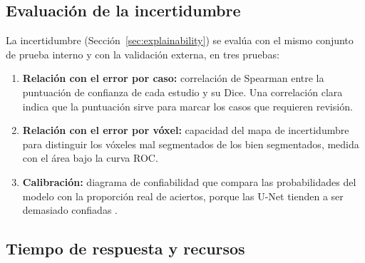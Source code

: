 \subsection{Evaluación de la incertidumbre}\label{sec:uncertainty-eval}
La incertidumbre (Sección~\ref{sec:explainability}) se evalúa con el mismo
conjunto de prueba interno y con la validación externa, en tres pruebas:

\begin{enumerate}
    \item \textbf{Relación con el error por caso:} correlación de Spearman
          entre la puntuación de confianza de cada estudio y su Dice. Una
          correlación clara indica que la puntuación sirve para marcar los
          casos que requieren revisión.
    \item \textbf{Relación con el error por vóxel:} capacidad del mapa de
          incertidumbre para distinguir los vóxeles mal segmentados de los
          bien segmentados, medida con el área bajo la curva ROC.
    \item \textbf{Calibración:} diagrama de confiabilidad que compara las
          probabilidades del modelo con la proporción real de aciertos, porque
          las U-Net tienden a ser demasiado confiadas \parencite{mehrtash2020}.
\end{enumerate}


\subsection{Tiempo de respuesta y recursos}\label{sec:resources}
